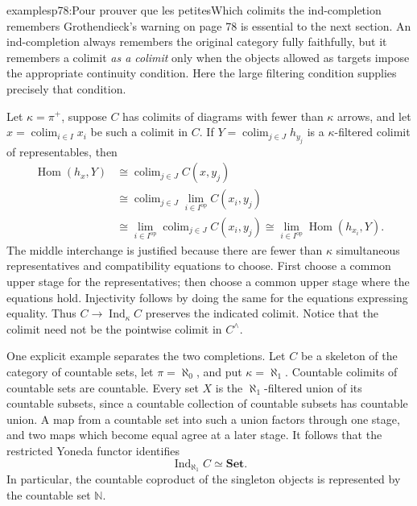 \begin{dcomment}{examples}{p78:Pour prouver que les petites}{Which colimits the ind-completion remembers}
Grothendieck's warning on page 78 is essential to the next section.  An ind-completion always remembers the original category fully faithfully, but it remembers a colimit \emph{as a colimit} only when the objects allowed as targets impose the appropriate continuity condition.  Here the large filtering condition supplies precisely that condition.

Let $\kappa=\pi^+$, suppose $C$ has colimits of diagrams with fewer than $\kappa$ arrows, and let $x=\operatorname{colim}_{i\in I}x_i$ be such a colimit in $C$.  If $Y=\operatorname{colim}_{j\in J}h_{y_j}$ is a $\kappa$-filtered colimit of representables, then
\[
 \begin{split}
 \operatorname{Hom}(h_x,Y)
 &\cong\operatorname{colim}_{j\in J}C(x,y_j)\\
 &\cong\operatorname{colim}_{j\in J}
          \operatorname{lim}_{i\in I^{\mathrm{op}}}C(x_i,y_j)\\
 &\cong\operatorname{lim}_{i\in I^{\mathrm{op}}}
          \operatorname{colim}_{j\in J}C(x_i,y_j)
 \cong\operatorname{lim}_{i\in I^{\mathrm{op}}}\operatorname{Hom}(h_{x_i},Y).
 \end{split}
\]
The middle interchange is justified because there are fewer than $\kappa$ simultaneous representatives and compatibility equations to choose.  First choose a common upper stage for the representatives; then choose a common upper stage where the equations hold.  Injectivity follows by doing the same for the equations expressing equality.  Thus $C\to\operatorname{Ind}_\kappa C$ preserves the indicated colimit.  Notice that the colimit need not be the pointwise colimit in $C^\wedge$.

One explicit example separates the two completions.  Let $C$ be a skeleton of the category of countable sets, let $\pi=\aleph_0$, and put $\kappa=\aleph_1$.  Countable colimits of countable sets are countable.  Every set $X$ is the $\aleph_1$-filtered union of its countable subsets, since a countable collection of countable subsets has countable union.  A map from a countable set into such a union factors through one stage, and two maps which become equal agree at a later stage.  It follows that the restricted Yoneda functor identifies
\[
 \operatorname{Ind}_{\aleph_1}C\simeq\mathbf{Set}.
\]
In particular, the countable coproduct of the singleton objects is represented by the countable set $\mathbb N$.


\end{dcomment}
